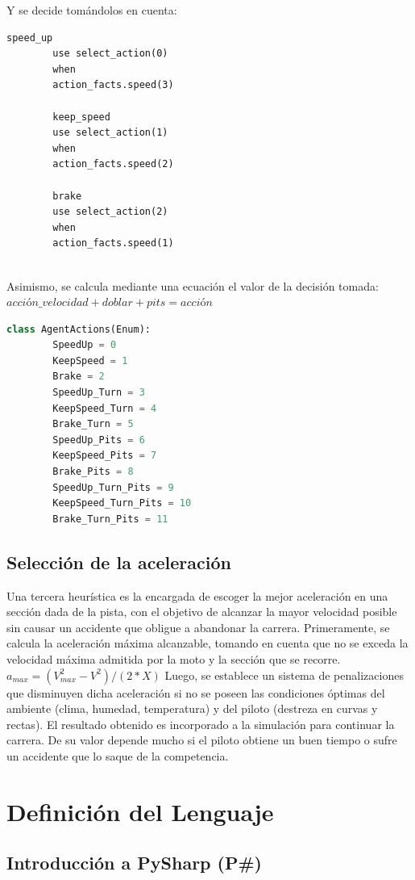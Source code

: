 \documentclass[12pt, letterpaper,spanish]{article}
\theoremstyle{definition}
\theoremstyle{remark}
\begin{document}
	Y se decide tomándolos en cuenta:
	\begin{lstlisting}[language={PySharp}, label={Script}]
		speed_up
		use select_action(0)
		when
		action_facts.speed(3)
		
		keep_speed
		use select_action(1)
		when
		action_facts.speed(2)
		
		brake
		use select_action(2)
		when
		action_facts.speed(1)
		
	\end{lstlisting}
	
	Asimismo, se calcula mediante una ecuación el valor de la decisión tomada:
	$acción\_velocidad + doblar + pits = acción$
	
	\begin{lstlisting}[language={Python}, label={Script}]
		class AgentActions(Enum):
		SpeedUp = 0
		KeepSpeed = 1
		Brake = 2
		SpeedUp_Turn = 3
		KeepSpeed_Turn = 4
		Brake_Turn = 5
		SpeedUp_Pits = 6
		KeepSpeed_Pits = 7
		Brake_Pits = 8
		SpeedUp_Turn_Pits = 9
		KeepSpeed_Turn_Pits = 10
		Brake_Turn_Pits = 11
	\end{lstlisting}
	
	\subsection{Selección de la aceleración}
	Una tercera heurística es la encargada de escoger la mejor aceleración en una sección dada de la pista, con el objetivo de alcanzar la mayor velocidad posible sin causar un accidente que obligue a abandonar la carrera. 
	Primeramente, se calcula la aceleración máxima alcanzable, tomando en cuenta que no se exceda la velocidad máxima admitida por la moto y la sección que se recorre.
	$a_{max}=(V_{max}^{2}-V^{2})/(2*X)$
	Luego, se establece un sistema de penalizaciones que disminuyen dicha aceleración si no se poseen las condiciones óptimas del ambiente (clima, humedad, temperatura) y del piloto (destreza en curvas y rectas).
	El resultado obtenido es incorporado a la simulación para continuar la carrera. De su valor depende mucho si el piloto obtiene un buen tiempo o sufre un accidente que lo saque de la competencia.


\newpage

\section{Definición del Lenguaje {\footnotesize \cite{conferenciasC}\cite{ullman}}}
	\subsection{Introducción a PySharp (P\#)}
\end{document}
